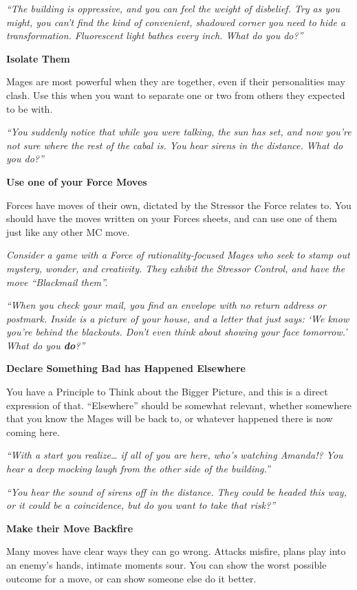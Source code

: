 \documentclass[
  oneside,
  statementpaper,
  9pt]{memoir}
\begin{document}
\emph{``The building is oppressive, and you can feel the weight of
disbelief. Try as you might, you can't find the kind of convenient,
shadowed corner you need to hide a transformation. Fluorescent light
bathes every inch. What do you do?''}

\textbf{Isolate Them}

Mages are most powerful when they are together, even if their
personalities may clash. Use this when you want to separate one or two
from others they expected to be with.

\emph{``You suddenly notice that while you were talking, the sun has
set, and now you're not sure where the rest of the cabal is. You hear
sirens in the distance. What do you do?''}

\textbf{Use one of your Force Moves}

Forces have moves of their own, dictated by the Stressor the Force
relates to. You should have the moves written on your Forces sheets, and
can use one of them just like any other MC move.

\emph{Consider a game with a Force of rationality-focused Mages who seek
to stamp out mystery, wonder, and creativity. They exhibit the Stressor
Control, and have the move ``Blackmail them''.}

\emph{``When you check your mail, you find an envelope with no return
address or postmark. Inside is a picture of your house, and a letter
that just says: `We know you're behind the blackouts. Don't even think
about showing your face tomorrow.' What do you \textbf{do}?''}

\textbf{Declare Something Bad has Happened Elsewhere}

You have a Principle to Think about the Bigger Picture, and this is a
direct expression of that. ``Elsewhere'' should be somewhat relevant,
whether somewhere that you know the Mages will be back to, or whatever
happened there is now coming here.

\emph{``With a start you realize\ldots{} if all of you are here, who's
watching Amanda!? You hear a deep mocking laugh from the other side of
the building.''}

\emph{``You hear the sound of sirens off in the distance. They could be
headed this way, or it could be a coincidence, but do you want to take
that risk?''}

\textbf{Make their Move Backfire}

Many moves have clear ways they can go wrong. Attacks misfire, plans
play into an enemy's hands, intimate moments sour. You can show the
worst possible outcome for a move, or can show someone else do it
better.
\end{document}
